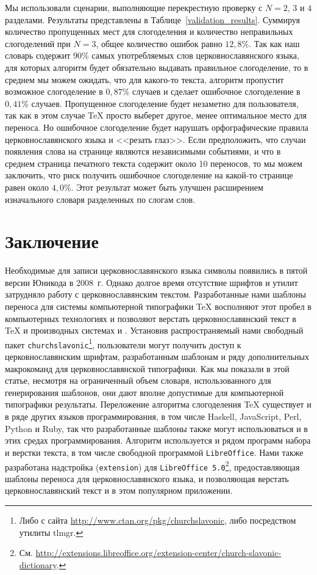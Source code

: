 \documentclass[12pt,a4paper,oneside]{extarticle}
\begin{document}
Мы использовали сценарии, выполняющие перекрестную проверку с $N = 2$, $3$ и $4$ разделами. Результаты представлены в Таблице~\ref{validation_results}. Суммируя количество пропущенных мест для слогоделения и количество неправильных слогоделений при  $N = 3$, общее количество ошибок равно $12,8\%$.  Так как наш словарь содержит $90\%$ самых употребляемых слов церковнославянского языка, для которых алгоритм будет обязательно выдавать правильное слогоделение, то в среднем мы можем ожидать, что для какого-то текста, алгоритм пропустит возможное слогоделение в $0,87\%$  случаев и сделает ошибочное слогоделение в $0,41\%$ случаев. Пропущенное слогоделение будет незаметно для пользователя, так как в этом случае \TeX{} просто выберет другое, менее оптимальное место для переноса. Но ошибочное слогоделение будет нарушать орфографические правила церковнославянского языка и <<резать глаз>>. Если предположить, что случаи появления слова на странице являются независимыми событиями, и что в среднем страница печатного текста содержит около 10 переносов, то мы можем заключить, что риск получить ошибочное слогоделение на какой-то странице равен около $4,0\%$. Этот результат может быть улучшен расширением изначального словаря разделенных по слогам слов.

\section{Заключение}

Необходимые для записи церковнославянского языка символы появились в пятой версии Юникода в 2008~г. Однако долгое время отсутствие шрифтов и утилит затрудняло работу с церковнославянским текстом. Разработанные нами шаблоны переноса для системы компьютерной типографики \TeX{} восполняют этот пробел в компьютерных технологиях и позволяют верстать церковнославянский текст в \TeX{} и производных системах \XeTeX{} и \LuaTeX{}. Установив распространяемый нами свободный пакет \texttt{churchslavonic}\footnote{Либо с сайта \url{http://www.ctan.org/pkg/churchslavonic}, либо посредством утилиты tlmgr.}, пользователи могут получить доступ к церковнославянским шрифтам, разработанным шаблонам и ряду дополнительных макрокоманд для церковнославянской типографики. Как мы показали в этой статье, несмотря на ограниченный объем словаря, использованного для генерирования шаблонов, они дают вполне допустимые для компьютерной типографики результаты. Переложение алгоритма слогоделения \TeX{}  существует и в ряде других языков программирования, в том числе Haskell, JavaScript, Perl, Python и Ruby, так что разработанные шаблоны также могут использоваться и в этих средах программирования. Алгоритм используется и рядом программ набора и верстки текста, в том числе свободной программой \verb+LibreOffice+. Нами также разработана надстройка (\verb+extension+) для \verb+LibreOffice 5.0+\footnote{См. \url{http://extensions.libreoffice.org/extension-center/church-slavonic-dictionary}.}, предоставляющая шаблоны переноса для церковнославянского языка, и позволяющая верстать церковнославянский текст и в этом популярном приложении.

\printbibliography
\end{document}
